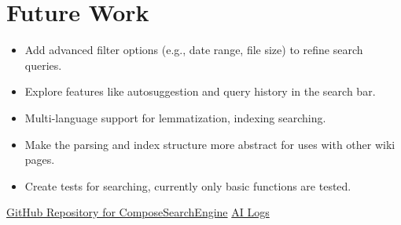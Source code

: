 \documentclass[conference]{IEEEtran}
\begin{document}
    \section{Future Work}{
    \begin{itemize}
        \item Add advanced filter options (e.g., date range, file size) to refine search queries.
        \item Explore features like autosuggestion and query history in the search bar.
        \item Multi-language support for lemmatization, indexing searching.
        \item Make the parsing and index structure more abstract for uses with other wiki pages.
        \item Create tests for searching, currently only basic functions are tested.
    \end{itemize}
    }

    \begin{thebibliography}{00}
         \href{https://github.com/kastik/ComposeSearchEngine}{GitHub Repository for ComposeSearchEngine}
         \href{https://github.com/kastik/ComposeSearchEngine/blob/master/searchenginedocs/src/ai.log}{AI Logs}
    \end{thebibliography}
    \vspace{12pt}
\end{document}
